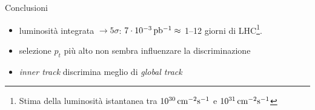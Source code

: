 \documentclass[italian]{beamer}
\begin{document}
\begin{frame}{Conclusioni} 
    \begin{itemize}
        \item luminosità integrata $\to 5\sigma$: $\unit[7\cdot
            10^{-3}]{pb^{-1}} \approx$ 1--12 giorni di
            LHC\footnote{Stima della luminosità istantanea tra
            $\unit[10^{30}]{cm^{-2}s^{-1}}$ e $\unit[10^{31}]{cm^{-2}s^{-1}}$}. 
        \item selezione $p_t$ più alto non sembra influenzare la discriminazione
        \item \emph{inner track} discrimina meglio di \emph{global track}
    \end{itemize}
\end{frame}
\end{document}
